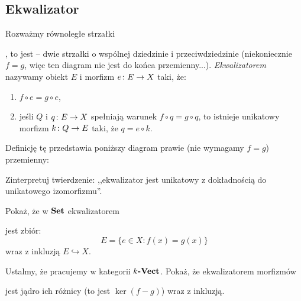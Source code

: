 \subsection{Ekwalizator}
\begin{defn}
  Rozważmy równoległe strzałki , to jest -- dwie strzałki o wspólnej dziedzinie i przeciwdziedzinie (niekoniecznie $f=g$, więc ten diagram nie jest do końca przemienny...). \emph{Ekwalizatorem} nazywamy obiekt $E$ i morfizm $e\colon E\to X$ taki, że:
  \begin{enumerate}
    \item $f\circ e = g\circ e$,
    \item jeśli $Q$ i $q\colon E\to X$ spełniają warunek $f\circ q = g\circ q$, to istnieje unikatowy morfizm $k\colon Q\to E$ taki, że $q=e\circ k$.
  \end{enumerate}
  Definicję tę przedstawia poniższy diagram prawie (nie wymagamy $f=g$) przemienny:
  \begin{center}
  \end{center}
\end{defn}

\begin{exc}
  Zinterpretuj twierdzenie: ,,ekwalizator jest unikatowy z dokładnością do unikatowego izomorfizmu''.
\end{exc}

\begin{exc}
  Pokaż, że w $\textbf{Set}$ ekwalizatorem  jest zbiór:
    $$E = \{e\in X : f(x) = g(x) \}$$
  wraz z inkluzją $E\hookrightarrow X$.
\end{exc}

\begin{exc}
  Ustalmy, że pracujemy w kategorii $k\textbf{-Vect}$. Pokaż, że ekwalizatorem morfizmów  jest jądro ich różnicy (to jest $\ker (f-g)$) wraz z inkluzją.
\end{exc}

